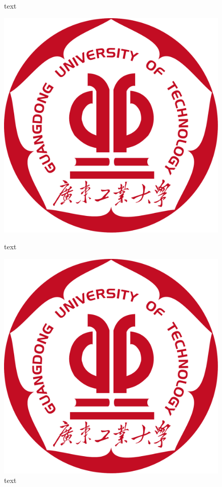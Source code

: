 \begin{figure}[h]
\begin{minipage}{0.4\textwidth}
        \caption{text}
    \end{minipage}
    \par \vspace{4em}
    \begin{minipage}{0.4\textwidth}
        \centering
        \includegraphics[width=\linewidth]{figures/logo.pdf}
        \caption{text}
    \end{minipage}
    \hfill
    \begin{minipage}{0.4\textwidth}
        \centering
        \includegraphics[width=\linewidth]{figures/logo.pdf}
        \caption{text}
    \end{minipage}
\end{figure}

